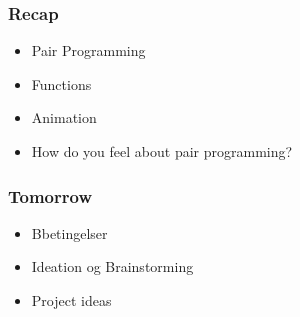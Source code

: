 \documentclass[10pt]{beamer}
\begin{document}
\begin{frame}
  \frametitle{Recap}
    \begin{itemize}
    \item Pair Programming
  	\item Functions
	\item Animation
	\item How do you feel about pair programming?
\end{itemize}
\end{frame}

\begin{frame}
\frametitle{Tomorrow}
\begin{itemize}
\item Bbetingelser
\item Ideation og Brainstorming
\item Project ideas
\end{itemize}
\end{frame}
\end{document}
